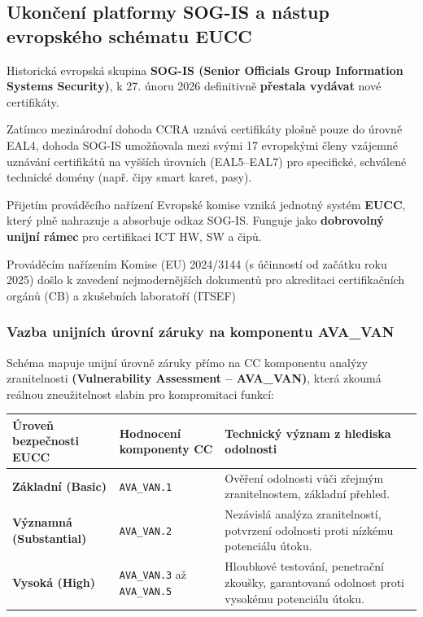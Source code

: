 \documentclass[10pt,a4paper]{article}
\begin{document}
	\subsection{Ukončení platformy SOG-IS a nástup evropského schématu EUCC}
	Historická evropská skupina \textbf{SOG-IS (Senior Officials Group Information Systems Security)}, k 27. únoru 2026 definitivně \textbf{přestala vydávat} nové certifikáty.
	
	Zatímco mezinárodní dohoda CCRA uznává certifikáty plošně pouze do úrovně EAL4, dohoda SOG-IS umožňovala mezi svými 17 evropskými členy vzájemné uznávání certifikátů na vyšších úrovních (EAL5–EAL7) pro specifické, schválené technické domény (např. čipy smart karet, pasy).
	
	Přijetím prováděcího nařízení Evropské komise vzniká jednotný systém \textbf{EUCC}, který plně nahrazuje a absorbuje odkaz SOG-IS. Funguje jako \textbf{dobrovolný unijní rámec} pro certifikaci ICT HW, SW a čipů.

	Prováděcím nařízením Komise (EU) 2024/3144 (s účinností od začátku roku 2025) došlo k zavedení nejmodernějších dokumentů pro akreditaci certifikačních orgánů (CB) a zkušebních laboratoří (ITSEF)
	
	\subsubsection*{Vazba unijních úrovní záruky na komponentu AVA\_VAN}
	Schéma mapuje unijní úrovně záruky přímo na CC komponentu analýzy zranitelnosti \textbf{(Vulnerability Assessment – AVA\_VAN)}, která zkoumá reálnou zneužitelnost slabin pro kompromitaci funkcí:
	\begin{center}
		\small
		\begin{tabular}{|l|l|p{7cm}|}
			\hline
			\textbf{Úroveň bezpečnosti EUCC} & \textbf{Hodnocení komponenty CC} & \textbf{Technický význam z hlediska odolnosti} \\ \hline
			\textbf{Základní (Basic)} & \texttt{AVA\_VAN.1} & Ověření odolnosti vůči zřejmým zranitelnostem, základní přehled. \\ \hline
			\textbf{Významná (Substantial)} & \texttt{AVA\_VAN.2} & Nezávislá analýza zranitelností, potvrzení odolnosti proti nízkému potenciálu útoku. \\ \hline
			\textbf{Vysoká (High)} & \texttt{AVA\_VAN.3} až \texttt{AVA\_VAN.5} & Hloubkové testování, penetrační zkoušky, garantovaná odolnost proti vysokému potenciálu útoku. \\ \hline
		\end{tabular}
	\end{center}
	
\end{document}
